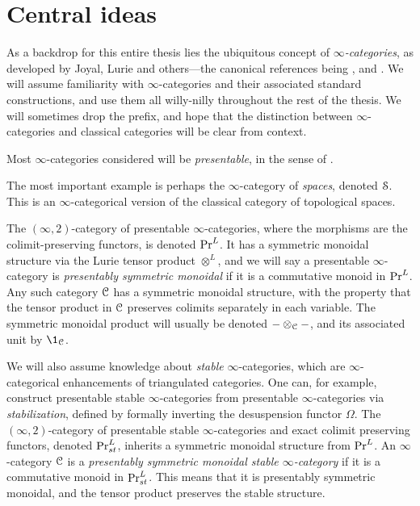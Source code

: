 
\section{Central ideas}
\label{ch0:sec:Central-ideas}

As a backdrop for this entire thesis lies the ubiquitous concept of \emph{$\infty$-categories}, as developed by Joyal, Lurie and others---the canonical references being \cite{joyal_02}, \cite{lurie_09} and \cite{Lurie_HA}. We will assume familiarity with $\infty$-categories and their associated standard constructions, and use them all willy-nilly throughout the rest of the thesis. We will sometimes drop the prefix, and hope that the distinction between $\infty$-categories and classical categories will be clear from context.  

Most $\infty$-categories considered will be \emph{presentable}, in the sense of \cite[Chapter 5]{lurie_09}. 

\begin{example}
    The most important example is perhaps the $\infty$-category of \emph{spaces}, denoted $\EuScript{S}$. This is an $\infty$-categorical version of the classical category of topological spaces. 
\end{example}

The $(\infty, 2)$-category of presentable $\infty$-categories, where the morphisms are the colimit-preserving functors, is denoted $\mathrm{Pr}^L$. It has a symmetric monoidal structure via the Lurie tensor product $\otimes^L$, and we will say a presentable $\infty$-category is \emph{presentably symmetric monoidal} if it is a commutative monoid in $\mathrm{Pr}^L$. Any such category $\EuScript{C}$ has a symmetric monoidal structure, with the property that the tensor product in $\EuScript{C}$ preserves colimits separately in each variable. The symmetric monoidal product will usually be denoted $-\otimes_{\EuScript{C}} -$, and its associated unit by $\1_\C$. 

We will also assume knowledge about \emph{stable} $\infty$-categories, which are $\infty$-categorical enhancements of triangulated categories. One can, for example, construct presentable stable $\infty$-categories from presentable $\infty$-categories via \emph{stabilization}, defined by formally inverting the desuspension functor $\Omega$. The $(\infty, 2)$-category of presentable stable $\infty$-categories and exact colimit preserving functors, denoted $\mathrm{Pr}_{st}^L$, inherits a symmetric monoidal structure from $\mathrm{Pr}^L$. An $\infty$-category $\EuScript{C}$ is a \emph{presentably symmetric monoidal stable $\infty$-category} if it is a commutative monoid in $\mathrm{Pr}_{st}^L$. This means that it is presentably symmetric monoidal, and the tensor product preserves the stable structure. 

